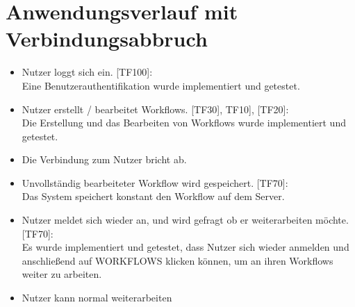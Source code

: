         \section{Anwendungsverlauf mit Verbindungsabbruch}
        \begin{itemize}
            \item Nutzer loggt sich ein. [TF100]:
            \vspace{1mm}\\Eine Benutzerauthentifikation wurde implementiert und getestet.
            \item Nutzer erstellt / bearbeitet Workflows. [TF30], TF10], [TF20]:
            \vspace{1mm}\\Die Erstellung und das Bearbeiten von Workflows wurde implementiert und getestet.
            \item Die Verbindung zum Nutzer bricht ab.
            \item Unvollständig bearbeiteter Workflow wird gespeichert. [TF70]:
            \vspace{1mm}\\Das System speichert konstant den Workflow auf dem Server.
            \item Nutzer meldet sich wieder an, und wird gefragt ob er weiterarbeiten möchte. [TF70]:
            \vspace{1mm}\vspace{1mm}\\Es wurde implementiert und getestet, dass Nutzer sich wieder anmelden und anschließend auf \glqq WORKFLOWS\grqq{} klicken können, um an ihren Workflows weiter zu arbeiten. 
            \item Nutzer kann normal weiterarbeiten
        \end{itemize}